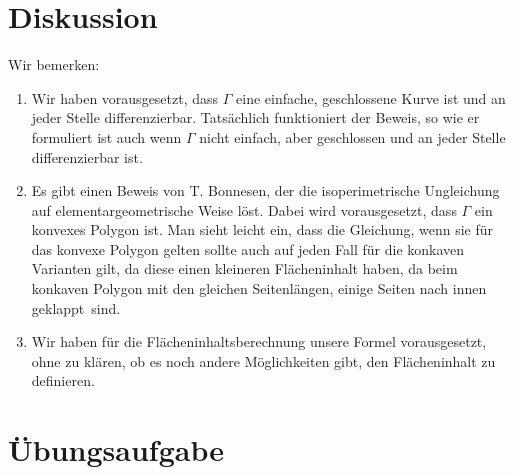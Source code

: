 \documentclass[12pt,a4paper]{article}
\theoremstyle{plain}
\numberwithin{equation}{section}
\begin{document}
\section{Diskussion}
Wir bemerken:
\begin{enumerate}
\item Wir haben vorausgesetzt, dass $\Gamma$ eine einfache, geschlossene Kurve ist und an jeder Stelle differenzierbar. Tatsächlich funktioniert der Beweis, so wie er formuliert ist auch wenn $\Gamma$ nicht einfach, aber geschlossen und an jeder Stelle differenzierbar ist.
\item Es gibt einen Beweis von T. Bonnesen, der die isoperimetrische Ungleichung auf elementargeometrische Weise löst. Dabei wird vorausgesetzt, dass $\Gamma$ ein konvexes Polygon ist. Man sieht leicht ein, dass die Gleichung, wenn sie für das konvexe Polygon gelten sollte auch auf jeden Fall für die konkaven Varianten gilt, da diese einen kleineren Flächeninhalt haben, da beim konkaven Polygon mit den gleichen Seitenlängen, einige Seiten \glqq nach innen geklappt\grqq\ sind.
\item Wir haben für die Flächeninhaltsberechnung unsere Formel vorausgesetzt, ohne zu klären, ob es noch andere Möglichkeiten gibt, den Flächeninhalt zu definieren.
\end{enumerate}
\section{Übungsaufgabe}
\end{document}
